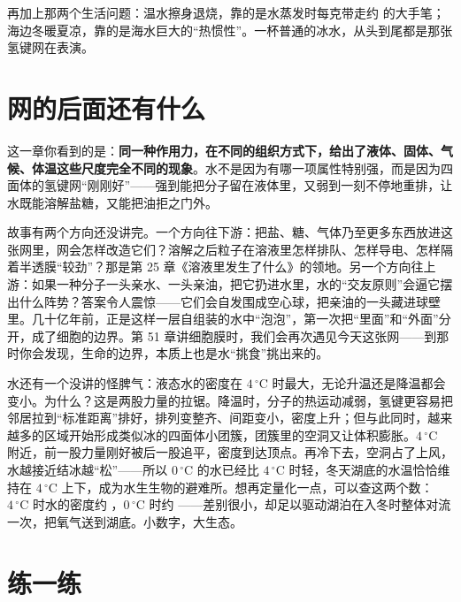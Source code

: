再加上那两个生活问题：温水擦身退烧，靠的是水蒸发时每克带走约  的大手笔；海边冬暖夏凉，靠的是海水巨大的“热惯性”。一杯普通的冰水，从头到尾都是那张氢键网在表演。

\section{网的后面还有什么}

这一章你看到的是：\textbf{同一种作用力，在不同的组织方式下，给出了液体、固体、气候、体温这些尺度完全不同的现象}。水不是因为有哪一项属性特别强，而是因为四面体的氢键网“刚刚好”——强到能把分子留在液体里，又弱到一刻不停地重排，让水既能溶解盐糖，又能把油拒之门外。

故事有两个方向还没讲完。一个方向往下游：把盐、糖、气体乃至更多东西放进这张网里，网会怎样改造它们？溶解之后粒子在溶液里怎样排队、怎样导电、怎样隔着半透膜“较劲”？那是第 25 章《溶液里发生了什么》的领地。另一个方向往上游：如果一种分子一头亲水、一头亲油，把它扔进水里，水的“交友原则”会逼它摆出什么阵势？答案令人震惊——它们会自发围成空心球，把亲油的一头藏进球壁里。几十亿年前，正是这样一层自组装的水中“泡泡”，第一次把“里面”和“外面”分开，成了细胞的边界。第 51 章讲细胞膜时，我们会再次遇见今天这张网——到那时你会发现，生命的边界，本质上也是水“挑食”挑出来的。

\begin{tiaozhan}
水还有一个没讲的怪脾气：液态水的密度在 $4\,^{\circ}\mathrm{C}$ 时最大，无论升温还是降温都会变小。为什么？这是两股力量的拉锯。降温时，分子的热运动减弱，氢键更容易把邻居拉到“标准距离”排好，排列变整齐、间距变小，密度上升；但与此同时，越来越多的区域开始形成类似冰的四面体小团簇，团簇里的空洞又让体积膨胀。$4\,^{\circ}\mathrm{C}$ 附近，前一股力量刚好被后一股追平，密度到达顶点。再冷下去，空洞占了上风，水越接近结冰越“松”——所以 $0\,^{\circ}\mathrm{C}$ 的水已经比 $4\,^{\circ}\mathrm{C}$ 时轻，冬天湖底的水温恰恰维持在 $4\,^{\circ}\mathrm{C}$ 上下，成为水生生物的避难所。想再定量化一点，可以查这两个数：$4\,^{\circ}\mathrm{C}$ 时水的密度约 ，$0\,^{\circ}\mathrm{C}$ 时约 ——差别很小，却足以驱动湖泊在入冬时整体对流一次，把氧气送到湖底。小数字，大生态。
\end{tiaozhan}

\section*{练一练}

